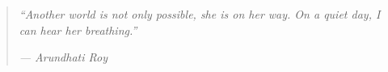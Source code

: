 %
\vspace*{7cm} %
%
\begin{quote}
    \textit{``Another world is not only possible, she is on her way. On a quiet day, I can hear her breathing.''}

    \hspace*{\fill}\textit{--- Arundhati Roy}
\end{quote}
%